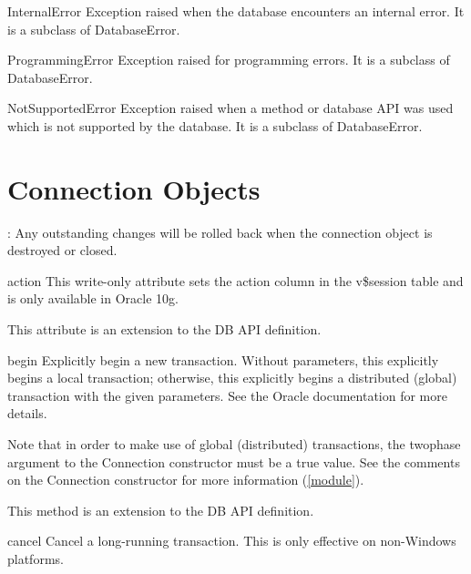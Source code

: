 \documentclass{manual}
\begin{document}
\begin{datadesc}{InternalError}
  Exception raised when the database encounters an internal error.
  It is a subclass of DatabaseError.
\end{datadesc}
 
\begin{datadesc}{ProgrammingError}
  Exception raised for programming errors. It is a subclass of DatabaseError.
\end{datadesc}
 
\begin{datadesc}{NotSupportedError}
  Exception raised when a method or database API was used which is not
  supported by the database. It is a subclass of DatabaseError.
\end{datadesc}
 
\chapter{Connection Objects\label{connobj}}

: Any outstanding changes will be rolled back when the connection
object is destroyed or closed.

\begin{datadesc}{action}
  This write-only attribute sets the action column in the v\$session table and
  is only available in Oracle 10g.

   This attribute is an extension to the DB API definition.
\end{datadesc}

\begin{funcdesc}{begin}{}
  Explicitly begin a new transaction. Without parameters, this explicitly
  begins a local transaction; otherwise, this explicitly begins a distributed
  (global) transaction with the given parameters. See the Oracle documentation
  for more details.

  Note that in order to make use of global (distributed) transactions, the
  twophase argument to the Connection constructor must be a true value. See the
  comments on the Connection constructor for more information (\ref{module}).

   This method is an extension to the DB API definition.
\end{funcdesc}

\begin{funcdesc}{cancel}{}
  Cancel a long-running transaction. This is only effective on non-Windows
  platforms.
\end{funcdesc}
\end{document}
